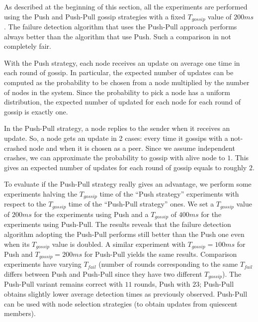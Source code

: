 As described at the beginning of this section, all the experiments are performed using the Push and Push-Pull gossip strategies with a fixed $T_{gossip}$ value of $200 \si{ms}$.
The failure detection algorithm that uses the Push-Pull approach performs always better than the algorithm that use Push.
Such a comparison in not completely fair.

With the Push strategy, each node receives an update on average one time in each round of gossip.
In particular, the expected number of updates can be computed as the probability to be chosen from a node multiplied by the number of nodes in the system.
Since the probability to pick a node has a uniform distribution, the expected number of updated for each node for each round of gossip is exactly one.

In the Push-Pull strategy, a node replies to the sender when it receives an update.
So, a node gets an update in 2 cases: every time it gossips with a not-crashed node and when it is chosen as a peer.
Since we assume independent crashes, we can approximate the probability to gossip with alive node to $1$.
This gives an expected number of updates for each round of gossip equals to roughly $2$.



To evaluate if the Push-Pull strategy really gives an advantage, we perform some experiments halving the $T_{gossip}$ time of the ``Push strategy'' experiments with respect to the $T_{gossip}$ time of the ``Push-Pull strategy'' ones.
We set a $T_{gossip}$ value of $200 \si{ms}$ for the experiments using Push and a $T_{gossip}$ of $400 \si{ms}$ for the experiments using Push-Pull.
The results reveals that the failure detection algorithm adopting the Push-Pull performs still better than the Push one even when its $T_{gossip}$ value is doubled.
A similar experiment with $T_{gossip} = 100 \si{ms}$ for Push and $T_{gossip} = 200 \si{ms}$ for Push-Pull yields the same results.
Comparison experiments have varying $T_{fail}$ (number of rounds corresponding to the same $T_{fail}$ differs between Push and Push-Pull since they have two different $T_{gossip}$). The Push-Pull variant remains correct with $11$ rounds, Push with $23$; Push-Pull obtains slightly lower average detection times as previously observed. Push-Pull can be used with node selection strategies (to obtain updates from quiescent members).

